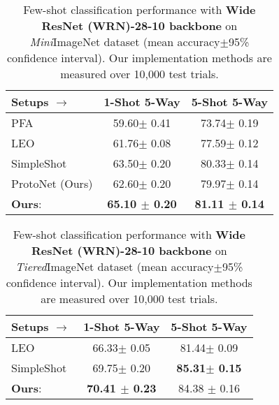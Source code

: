 \begin{table}[tbp]    
	\centering
	\tabcolsep 10pt
	\caption{Few-shot classification performance with \textbf{Wide ResNet (WRN)-28-10 backbone} on {\it Mini}ImageNet dataset (mean accuracy$\pm$95\% confidence interval). Our implementation methods are measured over 10,000 test trials.}
	{\small
		\begin{tabular}{@{\;}lcc@{\;}}
			\addlinespace
			\toprule
			Setups $\rightarrow$ & {\bf 1-Shot 5-Way} & {\bf 5-Shot 5-Way} \\    \midrule
			PFA~\cite{Qiao2017Few} & 59.60{\tiny $\pm$ 0.41} & 73.74{\tiny $\pm$ 0.19} \\
			LEO~\cite{Rusu2018Meta} & 61.76{\tiny $\pm$ 0.08} & 77.59{\tiny $\pm$ 0.12} \\
			SimpleShot~\cite{Wang2019Simple}& 63.50{\tiny $\pm$ 0.20} & 80.33{\tiny $\pm$ 0.14}\\
			ProtoNet (Ours)  & 62.60{\tiny $\pm$ 0.20} & 79.97{\tiny $\pm$ 0.14} \\
			\midrule
			{\bf Ours}: {\feat}      &  \bf 65.10 {\tiny $\pm$ 0.20} & \bf 81.11 {\tiny $\pm$ 0.14} \\
			\bottomrule
	\end{tabular}}
	\label{supp-tab:wrn}
\end{table}

\begin{table}[tbp]    
	\centering
	\tabcolsep 10pt
	\caption{Few-shot classification performance with \textbf{Wide ResNet (WRN)-28-10 backbone} on {\it Tiered}ImageNet dataset (mean accuracy$\pm$95\% confidence interval). Our implementation methods are measured over 10,000 test trials.}
	{\small
		\begin{tabular}{@{\;}lcc@{\;}}
			\addlinespace
			\toprule
			Setups $\rightarrow$ & {\bf 1-Shot 5-Way} & {\bf 5-Shot 5-Way} \\    \midrule
			LEO~\cite{Rusu2018Meta}  & 66.33{\tiny $\pm$ 0.05} & 81.44{\tiny $\pm$ 0.09} \\
			SimpleShot~\cite{Wang2019Simple}  & 69.75{\tiny $\pm$ 0.20} & \bf 85.31{\tiny $\pm$ 0.15} \\
			\midrule
			{\bf Ours}: {\feat}      &  \bf 70.41 {\tiny $\pm$ 0.23} &  84.38 {\tiny $\pm$ 0.16} \\
			\bottomrule
	\end{tabular}}
	\label{supp-tab:wrn_tiered}
\end{table}

